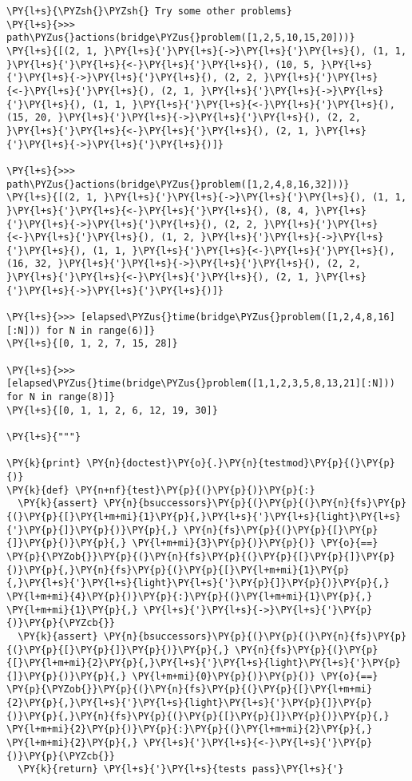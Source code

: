 \begin{Verbatim}[commandchars=\\\{\}]
\PY{l+s}{\PYZsh{}\PYZsh{} Try some other problems}
\PY{l+s}{>>> path\PYZus{}actions(bridge\PYZus{}problem([1,2,5,10,15,20]))}
\PY{l+s}{[(2, 1, }\PY{l+s}{'}\PY{l+s}{->}\PY{l+s}{'}\PY{l+s}{), (1, 1, }\PY{l+s}{'}\PY{l+s}{<-}\PY{l+s}{'}\PY{l+s}{), (10, 5, }\PY{l+s}{'}\PY{l+s}{->}\PY{l+s}{'}\PY{l+s}{), (2, 2, }\PY{l+s}{'}\PY{l+s}{<-}\PY{l+s}{'}\PY{l+s}{), (2, 1, }\PY{l+s}{'}\PY{l+s}{->}\PY{l+s}{'}\PY{l+s}{), (1, 1, }\PY{l+s}{'}\PY{l+s}{<-}\PY{l+s}{'}\PY{l+s}{), (15, 20, }\PY{l+s}{'}\PY{l+s}{->}\PY{l+s}{'}\PY{l+s}{), (2, 2, }\PY{l+s}{'}\PY{l+s}{<-}\PY{l+s}{'}\PY{l+s}{), (2, 1, }\PY{l+s}{'}\PY{l+s}{->}\PY{l+s}{'}\PY{l+s}{)]}

\PY{l+s}{>>> path\PYZus{}actions(bridge\PYZus{}problem([1,2,4,8,16,32]))}
\PY{l+s}{[(2, 1, }\PY{l+s}{'}\PY{l+s}{->}\PY{l+s}{'}\PY{l+s}{), (1, 1, }\PY{l+s}{'}\PY{l+s}{<-}\PY{l+s}{'}\PY{l+s}{), (8, 4, }\PY{l+s}{'}\PY{l+s}{->}\PY{l+s}{'}\PY{l+s}{), (2, 2, }\PY{l+s}{'}\PY{l+s}{<-}\PY{l+s}{'}\PY{l+s}{), (1, 2, }\PY{l+s}{'}\PY{l+s}{->}\PY{l+s}{'}\PY{l+s}{), (1, 1, }\PY{l+s}{'}\PY{l+s}{<-}\PY{l+s}{'}\PY{l+s}{), (16, 32, }\PY{l+s}{'}\PY{l+s}{->}\PY{l+s}{'}\PY{l+s}{), (2, 2, }\PY{l+s}{'}\PY{l+s}{<-}\PY{l+s}{'}\PY{l+s}{), (2, 1, }\PY{l+s}{'}\PY{l+s}{->}\PY{l+s}{'}\PY{l+s}{)]}

\PY{l+s}{>>> [elapsed\PYZus{}time(bridge\PYZus{}problem([1,2,4,8,16][:N])) for N in range(6)]}
\PY{l+s}{[0, 1, 2, 7, 15, 28]}

\PY{l+s}{>>> [elapsed\PYZus{}time(bridge\PYZus{}problem([1,1,2,3,5,8,13,21][:N])) for N in range(8)]}
\PY{l+s}{[0, 1, 1, 2, 6, 12, 19, 30]}

\PY{l+s}{"""}

\PY{k}{print} \PY{n}{doctest}\PY{o}{.}\PY{n}{testmod}\PY{p}{(}\PY{p}{)}
\PY{k}{def} \PY{n+nf}{test}\PY{p}{(}\PY{p}{)}\PY{p}{:}
  \PY{k}{assert} \PY{n}{bsuccessors}\PY{p}{(}\PY{p}{(}\PY{n}{fs}\PY{p}{(}\PY{p}{[}\PY{l+m+mi}{1}\PY{p}{,}\PY{l+s}{'}\PY{l+s}{light}\PY{l+s}{'}\PY{p}{]}\PY{p}{)}\PY{p}{,} \PY{n}{fs}\PY{p}{(}\PY{p}{[}\PY{p}{]}\PY{p}{)}\PY{p}{,} \PY{l+m+mi}{3}\PY{p}{)}\PY{p}{)} \PY{o}{==} \PY{p}{\PYZob{}}\PY{p}{(}\PY{n}{fs}\PY{p}{(}\PY{p}{[}\PY{p}{]}\PY{p}{)}\PY{p}{,}\PY{n}{fs}\PY{p}{(}\PY{p}{[}\PY{l+m+mi}{1}\PY{p}{,}\PY{l+s}{'}\PY{l+s}{light}\PY{l+s}{'}\PY{p}{]}\PY{p}{)}\PY{p}{,} \PY{l+m+mi}{4}\PY{p}{)}\PY{p}{:}\PY{p}{(}\PY{l+m+mi}{1}\PY{p}{,} \PY{l+m+mi}{1}\PY{p}{,} \PY{l+s}{'}\PY{l+s}{->}\PY{l+s}{'}\PY{p}{)}\PY{p}{\PYZcb{}}
  \PY{k}{assert} \PY{n}{bsuccessors}\PY{p}{(}\PY{p}{(}\PY{n}{fs}\PY{p}{(}\PY{p}{[}\PY{p}{]}\PY{p}{)}\PY{p}{,} \PY{n}{fs}\PY{p}{(}\PY{p}{[}\PY{l+m+mi}{2}\PY{p}{,}\PY{l+s}{'}\PY{l+s}{light}\PY{l+s}{'}\PY{p}{]}\PY{p}{)}\PY{p}{,} \PY{l+m+mi}{0}\PY{p}{)}\PY{p}{)} \PY{o}{==} \PY{p}{\PYZob{}}\PY{p}{(}\PY{n}{fs}\PY{p}{(}\PY{p}{[}\PY{l+m+mi}{2}\PY{p}{,}\PY{l+s}{'}\PY{l+s}{light}\PY{l+s}{'}\PY{p}{]}\PY{p}{)}\PY{p}{,}\PY{n}{fs}\PY{p}{(}\PY{p}{[}\PY{p}{]}\PY{p}{)}\PY{p}{,} \PY{l+m+mi}{2}\PY{p}{)}\PY{p}{:}\PY{p}{(}\PY{l+m+mi}{2}\PY{p}{,} \PY{l+m+mi}{2}\PY{p}{,} \PY{l+s}{'}\PY{l+s}{<-}\PY{l+s}{'}\PY{p}{)}\PY{p}{\PYZcb{}}
  \PY{k}{return} \PY{l+s}{'}\PY{l+s}{tests pass}\PY{l+s}{'}


\end{Verbatim}
